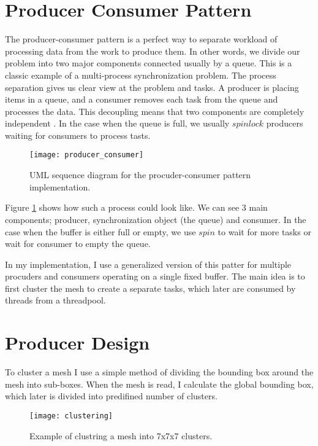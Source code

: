 \section{Producer Consumer Pattern}

The producer-consumer pattern is a perfect way to separate workload of processing data from the work to produce them. In other words, we divide our problem into two major components connected usually by a queue. This is a classic example of a multi-process synchronization problem. The process separation gives us clear view at the problem and tasks. A producer is placing items in a queue, and a consumer removes each task from the queue and processes the data. This decoupling means that two components are completely independent \cite{grand02}. In the case when the queue is full, we usually $spinlock$ producers waiting for consumers to process tasts.

\begin{figure}[H]
  \begin{center}
    \texttt{[image: producer\_consumer]}
    \caption{UML sequence diagram for the procuder-consumer pattern implementation.}
    \label{fig:uml}
  \end{center}
\end{figure}

Figure \ref{fig:uml} shows how such a process could look like. We can see 3 main components; producer, synchronization object (the queue) and consumer. In the case when the buffer is either full or empty, we use $spin$ to wait for more tasks or wait for consumer to empty the queue.

In my implementation, I use a generalized version of this patter for multiple procuders and consumers operating on a single fixed buffer. The main idea is to first cluster the mesh to create a separate tasks, which later are consumed by threads from a threadpool.

\newpage
\section{Producer Design}

To cluster a mesh I use a simple method of dividing the bounding box around the mesh into sub-boxes. When the mesh is read, I calculate the global bounding box, which later is divided into predifined number of clusters.

\begin{figure}[H]
  \begin{center}
    \texttt{[image: clustering]}
    \caption{Example of clustring a mesh into 7x7x7 clusters.}
    \label{fig:clustering}
  \end{center}
\end{figure}

